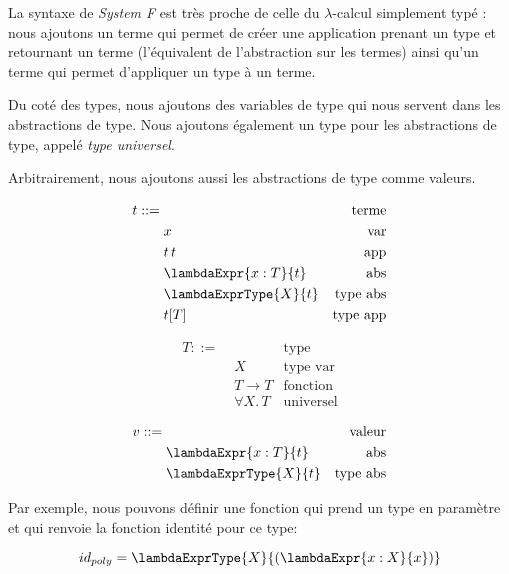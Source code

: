 La syntaxe de \textit{System F} est très proche de celle du $\lambda$-calcul
simplement typé : nous ajoutons un terme qui permet de créer une application
prenant un type et retournant un terme (l'équivalent de l'abstraction sur les
termes) ainsi qu'un terme qui permet d'appliquer un type à un terme.

Du coté des types, nous ajoutons des variables de type qui nous servent
dans les abstractions de type. Nous ajoutons également un type pour les
abstractions de type, appelé \textit{type universel}.

Arbitrairement, nous ajoutons aussi les abstractions de type comme valeurs.

\begin{minipage}{0.45\textwidth}
  \begin{align*}
    t ::= & \, & \text{terme} \\
          & \; x & \text{var} \\
          & \; t \, t & \text{app} \\
          & \; \lambdaExpr{x : T}{t} & \text{abs} \\
          & \; \lambdaExprType{X}{t} & \text{type abs} \\
          & \; t[T] & \text{type app}
  \end{align*}
\end{minipage}
\begin{minipage}{0.45\textwidth}
  \begin{align*}
    T ::= & \, & \text{type} \\
          & \; X & \text{type var} \\
          & \; T \rightarrow T & \text{fonction} \\
          & \; \forall X . \, T & \text{universel}
  \end{align*}
\end{minipage}
\begin{align*}
  v ::= & \, & \text{valeur} \\
        & \; \lambdaExpr{x : T}{t} & \text{abs} \\
        & \; \lambdaExprType{X}{t} & \text{type abs}
\end{align*}

Par exemple, nous pouvons définir une fonction qui prend un type en paramètre et
qui renvoie la fonction identité pour ce type:

\begin{equation*}
  id_{poly} = \lambdaExprType{X}{(\lambdaExpr{x : X}{x})}
\end{equation*}

